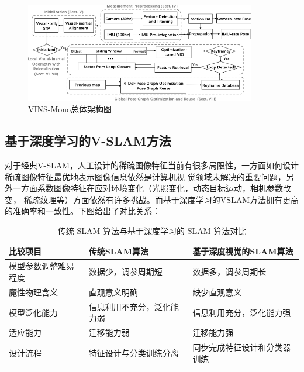 \documentclass[cs4size,a4paper]{ctexart}
\numberwithin{equation}{section}
\numberwithin{table}{section}
\numberwithin{figure}{section}
\begin{document}
\begin{figure}[H]
        \centering
        \includegraphics[width=0.9\textwidth]{figure/vins2.png}
        \caption{VINS-Mono总体架构图}
\end{figure}





\subsection{基于深度学习的V-SLAM方法}
对于经典V-SLAM，人工设计的稀疏图像特征当前有很多局限性，一方面如何设计稀疏图像特征最优地表示图像信息依然是计算机视
觉领域未解决的重要问题\cite{0000003}，另外一方面系数图像特征在应对环境变化（光照变化，动态目标运动，相机参数改变，
稀疏纹理等）方面依然有许多挑战。而基于深度学习的VSLAM方法拥有更高的准确率和一致性。下图给出了对比关系：
\begin{table}[H]
        \centering
        \begin{tabular}{l|ll}
        \toprule
        比较项目   &传统SLAM算法 & 基于深度视觉的SLAM算法\\
        \midrule[2pt]
        模型参数调整难易程度 & 数据少，调参周期短    & 数据多，调参周期长\\
        魔性物理含义 & 直观意义明确   & 缺少直观意义\\
        模型泛化能力 & 信息利用不充分，泛化能力弱  &  信息利用充分，泛化能力强\\
        适应能力 &  迁移能力弱  & 迁移能力强\\
        设计流程 &  特征设计与分类训练分离 & 同步完成特征设计和分类器训练\\
        \bottomrule
        \end{tabular}
        \caption{传统 SLAM 算法与基于深度学习的 SLAM 算法对比\cite{ZHAOYang:889}}
\end{table}


\end{document}
